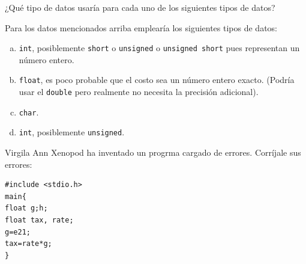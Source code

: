 \documentclass[spanish,addpoints,answers,a4paper]{exam}
\begin{document}
\begin{questions}

\question ¿Qué tipo de datos usaría para cada uno de los siguientes tipos de datos?


\begin{solution}
Para los datos mencionados arriba emplearía los siguientes tipos de datos:
\begin{enumerate}[(a)]
	\item \texttt{int}, posiblemente \texttt{short} o \texttt{unsigned} o \texttt{unsigned short} pues representan un número entero.
	
	\item \texttt{float}, es poco probable que el costo sea un número entero exacto. (Podría usar el \texttt{double} pero realmente no necesita la precisión adicional).
	
	\item \texttt{char}.
	
	\item \texttt{int}, posiblemente \texttt{unsigned}.
\end{enumerate}
\end{solution}

\question Virgila Ann Xenopod ha inventado un progrma cargado de errores. Corríjale sus errores:

\begin{verbatim}
#include <stdio.h>
main{
float g;h;
float tax, rate;
g=e21;
tax=rate*g;
}
\end{verbatim}


\end{questions}
\end{document}

